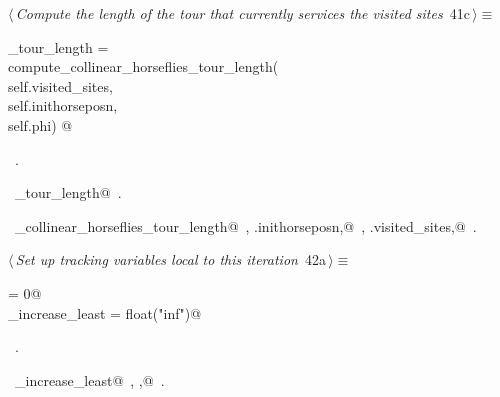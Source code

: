 \documentclass[11.5pt]{report}
\begin{document}
\begin{flushleft} \small\label{scrap47}\raggedright\small
{} $\langle\,${\itshape Compute the length of the tour that currently services the visited sites}\nobreak\ {\footnotesize {41c}}$\,\rangle\equiv$
\vspace{-1ex}
\begin{list}{}{} \item
\mbox{}\verb@current_tour_length    = \@\\
\mbox{}\verb@         compute_collinear_horseflies_tour_length(\@\\
\mbox{}\verb@                    self.visited_sites,\@\\
\mbox{}\verb@                    self.inithorseposn,\@\\
\mbox{}\verb@                    self.phi) @\\
\mbox{}\verb@@{\NWsep}
\end{list}
\vspace{-1.5ex}
\footnotesize
\begin{list}{}{\setlength{\itemsep}{-\parsep}\setlength{\itemindent}{-\leftmargin}}
\item \NWtxtMacroRefIn\ .
\item \NWtxtIdentsDefed\nobreak\  \verb@current_tour_length@\nobreak\ .\item \NWtxtIdentsUsed\nobreak\  \verb@compute_collinear_horseflies_tour_length@\nobreak\ , \verb@self.inithorseposn,@\nobreak\ , \verb@self.visited_sites,@\nobreak\ .
\item{}
\end{list}
\vspace{4ex}
\end{flushleft}
\vspace{-0.8cm}\newchunk 
\begin{flushleft} \small\label{scrap48}\raggedright\small
{} $\langle\,${\itshape Set up tracking variables local to this iteration}\nobreak\ {\footnotesize {42a}}$\,\rangle\equiv$
\vspace{-1ex}
\begin{list}{}{} \item
\mbox{}\verb@ibest                = 0@\\
\mbox{}\verb@delta_increase_least = float("inf")@\\
\mbox{}\verb@@{\NWsep}
\end{list}
\vspace{-1.5ex}
\footnotesize
\begin{list}{}{\setlength{\itemsep}{-\parsep}\setlength{\itemindent}{-\leftmargin}}
\item \NWtxtMacroRefIn\ .
\item \NWtxtIdentsDefed\nobreak\  \verb@delta_increase_least@\nobreak\ , \verb@ibest,@\nobreak\ .
\item{}
\end{list}
\vspace{4ex}
\end{flushleft}
\end{document}
